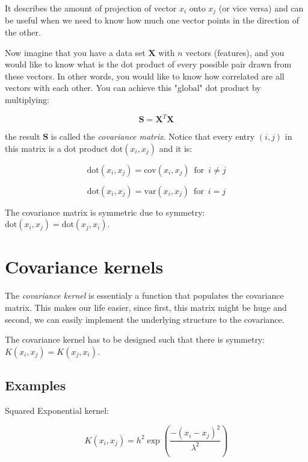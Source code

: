 \documentclass[10pt,twocolumn]{article}
\begin{document}
It describes the amount of projection of vector $x_i$ onto $x_j$ (or vice versa) and can be useful when we need to know how much one vector points in the direction of the other. 

Now imagine that you have a data set $\mathbf{X}$ with $n$ vectors (features), and you would like to know what is the dot product of every possible pair drawn from these vectors. In other words, you would like to know how correlated are all vectors with each other. You can achieve this "global" dot product by multiplying:

\begin{equation}
\mathbf{S} = \mathbf{X}^T \mathbf{X} 
\end{equation}

the result $\mathbf{S}$ is called the \textit{covariance matrix}. Notice that every entry $(i,j)$ in this matrix is a dot product $\text{dot}(x_i, x_j)$ and it is:

\begin{equation}
\text{dot}(x_i, x_j) = \text{cov}(x_i, x_j) \,\,\, \text{for} \,\,\, i \neq j
\end{equation}

\begin{equation}
\text{dot}(x_i, x_j) = \text{var}(x_i, x_j) \,\,\, \text{for} \,\,\, i = j
\end{equation}

The covariance matrix is symmetric due to symmetry: $\text{dot}(x_i, x_j) = \text{dot}(x_j, x_i)$.

\section{Covariance kernels}

The \textit{covariance kernel} is essentialy a function that populates the covariance matrix. This makes our life easier, since first, this matrix might be huge and second, we can easily implement the underlying structure to the covariance.

The covariance kernel has to be designed such that there is symmetry: $K(x_i, x_j) = K(x_j, x_i)$.

\subsection{Examples}

Squared Exponential kernel:

\begin{equation}
K(x_i, x_j) = h^2 \exp(\frac{- (x_i - x_j)^2}{\lambda^2})
\end{equation}
\end{document}
